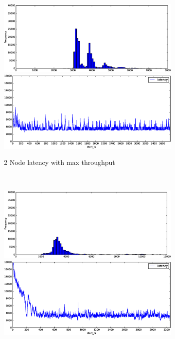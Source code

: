 \begin{figure}
    \centering
    \begin{subfigure}[b]{0.3\textwidth}
        \includegraphics[width=\textwidth]{eps/spark_agg_2node_th_max_hist}
         \includegraphics[width=\textwidth]{eps/spark_agg_2node_th_max_ts}

        \caption{2 Node latency with max throughput}
    \end{subfigure}
    ~ 
    \begin{subfigure}[b]{0.3\textwidth}
        \includegraphics[width=\textwidth]{eps/spark_agg_4node_th_max_hist}
         \includegraphics[width=\textwidth]{eps/spark_agg_4node_th_max_ts}


\end{subfigure}
\end{figure}
